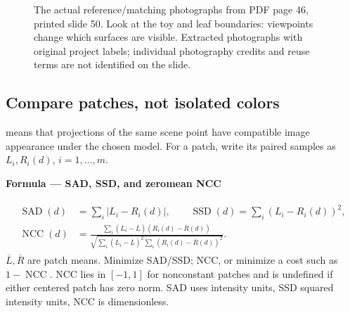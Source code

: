 \documentclass[letterpaper,11pt,english,openany,oneside]{jupyterBook}
\begin{document}
\begin{figure}[H]
\centering
\capstart

\noindent{}
\caption{The actual reference/matching photographs from PDF page 46, printed slide 50. Look at the toy and leaf boundaries: viewpoints change which surfaces are visible. Extracted photographs with original project labels; individual photography credits and reuse terms are not identified on the slide.}\label{\detokenize{lectures/lecture04/matching:fig-lec04-pair}}\end{figure}


\subsection{Compare patches, not isolated colors}
\label{\detokenize{lectures/lecture04/matching:compare-patches-not-isolated-colors}}
\sphinxAtStartPar
{} means that projections of the same scene point have compatible image appearance under the chosen model. For a patch, write its paired samples as \(L_i,R_i(d)\), \(i=1,\ldots,m\).

\begin{TextbookBox}
\textbf{Formula — SAD, SSD, and zero\sphinxhyphen{}mean NCC}\par\smallskip
\begin{equation}\label{equation:lectures/lecture04/matching:eq-lec04-patch-costs}
\begin{split}\begin{aligned}
\operatorname{SAD}(d)&=\sum_i|L_i-R_i(d)|,\qquad
\operatorname{SSD}(d)=\sum_i(L_i-R_i(d))^2,\\
\operatorname{NCC}(d)&=
\frac{\sum_i(L_i-\overline L)(R_i(d)-\overline R(d))}
{\sqrt{\sum_i(L_i-\overline L)^2\sum_i(R_i(d)-\overline R(d))^2}}.
\end{aligned}\end{split}
\end{equation}
\sphinxAtStartPar
\(\overline L,\overline R\) are patch means. Minimize SAD/SSD;  NCC, or minimize a cost such as \(1-\operatorname{NCC}\). NCC lies in \([-1,1]\) for nonconstant patches and is undefined if either centered patch has zero norm. SAD uses intensity units, SSD squared intensity units, NCC is dimensionless.

\end{TextbookBox}
\end{document}
